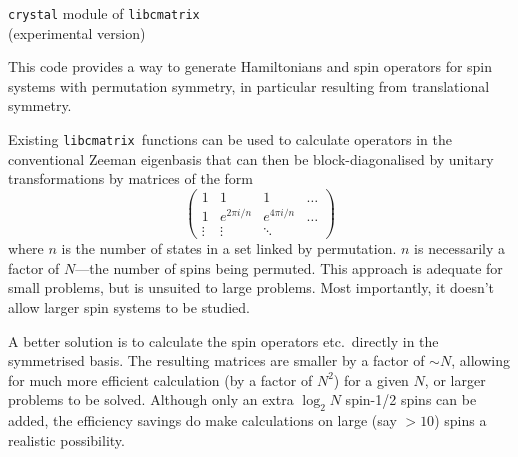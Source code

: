 \documentclass[11pt,a4paper]{article}
\newcommand{\libname}{{\tt libcmatrix}}
\begin{document}
\begin{center}
\Large {\tt crystal} module of {\tt libcmatrix}\\
\large (experimental version)
\end{center}

This code provides a way to generate Hamiltonians and spin operators
for spin systems with permutation symmetry, in particular resulting
from translational symmetry.

Existing \libname\ functions can be used
to calculate operators in the conventional Zeeman eigenbasis that can then be
block-diagonalised by unitary transformations by matrices of the form
\begin{equation}
\begin{pmatrix}
1 & 1 & 1 & \dots \\
1 & e^{2\pi i/n} & e^{4\pi i/n} & \dots \\
\vdots & \vdots & \ddots & 
\end{pmatrix}
\label{Vmatrix}
\end{equation}
where $n$ is the number of states in a set linked by permutation.
$n$ is necessarily a factor of $N$---the number of spins being permuted.
This approach is adequate for small problems, but is unsuited to large 
problems.  Most importantly, it doesn't allow larger spin systems
to be studied.

A better solution is to calculate the spin operators etc.\
directly in the symmetrised basis.  The resulting matrices are smaller
by a factor of $\sim N$, allowing for much more efficient calculation
(by a factor of $N^2$) for a given $N$, or larger problems
to be solved.  Although only an extra $\log_2 N$ spin-1/2 spins can
be added, the efficiency savings do make calculations on large
(say $>10$) spins a realistic possibility.
\end{document}

